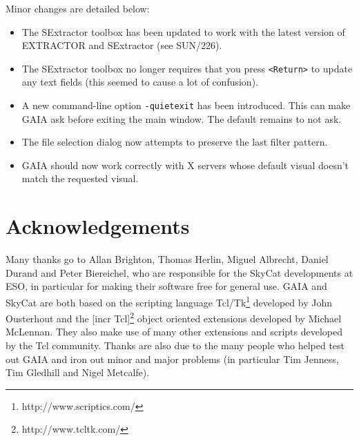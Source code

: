 \documentclass[twoside,11pt]{article}
\newcommand{\htmladdnormallinkfoot}[2]{#1\footnote{#2}}
\newcommand{\htmladdnormallink}[2]{#1}
\newcommand{\xref}[3]{#1}
\newcommand{\xlabel}[1]{}
\renewcommand{\_}{\texttt{\symbol{95}}}
\newcommand{\mytt}[1]{{\texttt{#1}}}
\begin{document}
  Minor changes are detailed below:
  \begin{itemize}

    \item The SExtractor toolbox has been updated to work with the
    latest version of EXTRACTOR and SExtractor (see
    \xref{SUN/226}{sun226}{}).

    \item The SExtractor toolbox no longer requires that you press
    \mytt{<Return>} to update any text fields (this seemed to cause a
    lot of confusion).

    \item A new command-line option \mytt{-quiet\_exit} has been
    introduced. This can make GAIA ask before exiting the main
    window. The default remains to not ask.

    \item The file selection dialog now attempts to preserve the last
    filter pattern.

    \item GAIA should now work correctly with X servers whose default
    visual doesn't match the requested visual.
  \end{itemize}

\section{\xlabel{acknowledgements}Acknowledgements}

Many thanks go to Allan Brighton, Thomas Herlin, Miguel Albrecht,
Daniel Durand and Peter Biereichel, who are responsible for the
\htmladdnormallink{SkyCat}{http://archive.eso.org/skycat/}
developments at ESO, in particular for making their software free for
general use.
GAIA and SkyCat are both based on the scripting language
\htmladdnormallinkfoot{Tcl/Tk}{http://www.scriptics.com/} developed by
John Ousterhout and the \htmladdnormallinkfoot{[incr Tcl]}
{http://www.tcltk.com/} object oriented extensions developed by
Michael McLennan.
They also make use of many other extensions and scripts developed by
the Tcl community.
Thanks are also due to the many people who helped test out GAIA and
iron out minor and major problems (in particular Tim Jenness, Tim
Gledhill and Nigel Metcalfe).

\end{document}
